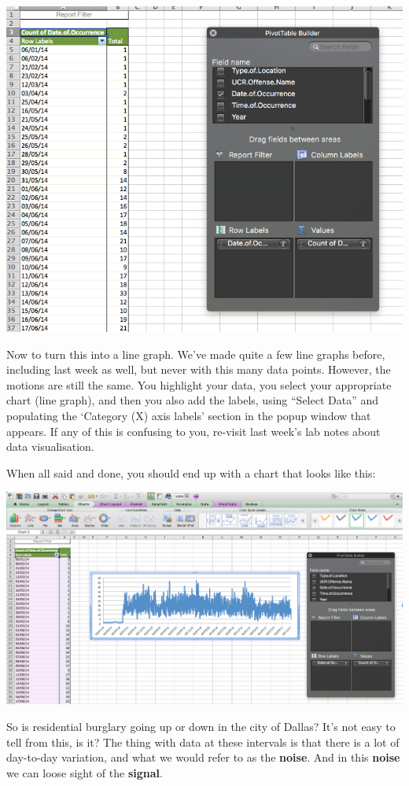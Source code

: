 \documentclass[]{book}
\theoremstyle{definition}
\theoremstyle{definition}
\theoremstyle{definition}
\theoremstyle{remark}
\begin{document}
\includegraphics{imgs/burg_day_pivot.png}

Now to turn this into a line graph. We've made quite a few line graphs
before, including last week as well, but never with this many data
points. However, the motions are still the same. You highlight your
data, you select your appropriate chart (line graph), and then you also
add the labels, using ``Select Data'' and populating the `Category (X)
axis labels' section in the popup window that appears. If any of this is
confusing to you, re-visit last week's lab notes about data
visualisation.

When all said and done, you should end up with a chart that looks like
this:

\includegraphics{imgs/line_burgs.png}

So is residential burglary going up or down in the city of Dallas? It's
not easy to tell from this, is it? The thing with data at these
intervals is that there is a lot of day-to-day variation, and what we
would refer to as the \textbf{noise}. And in this \textbf{noise} we can
loose sight of the \textbf{signal}.
\end{document}
